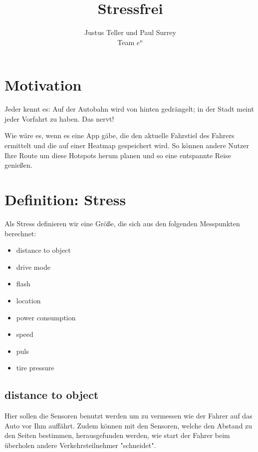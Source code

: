 \documentclass[twocolumn,a4paper,10pt]{IEEEtran}
\begin{document}
\onecolumn
\begin{titlepage}
	\centering
	\title{Stressfrei}
	\author{Justus Teller und Paul Surrey \\
	Team $e^\kappa$}
	\maketitle
	\tableofcontents
\end{titlepage}
	\newpage

\section{Motivation}
	Jeder kennt es: Auf der Autobahn wird von hinten gedrängelt; in der Stadt meint jeder Vorfahrt zu haben. Das nervt!
	
	Wie wäre es, wenn es eine App gäbe, die den aktuelle Fahrstiel des Fahrers ermittelt und die auf einer Heatmap gespeichert wird. So können andere Nutzer Ihre Route um diese Hotspots herum planen und so eine entspannte Reise genießen.

\section{Definition: Stress}
	Als Stress definieren wir eine Größe, die sich aus den folgenden Messpunkten berechnet:
	
	\begin{itemize}
		\item distance to object
		\item drive mode
		\item flash
		\item location
		\item power consumption
		\item speed
		\item puls
		\item tire pressure
	\end{itemize}

	\subsection{distance to object}
		Hier sollen die Sensoren benutzt werden um zu vermessen wie der Fahrer auf das Auto vor Ihm auffährt. Zudem können mit den Sensoren, welche den Abstand zu den Seiten bestimmen, herausgefunden werden, wie start der Fahrer beim überholen andere Verkehrsteilnehmer "schneidet".
\end{document}
